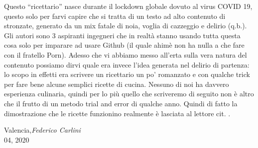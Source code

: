 %
%
%


\preface

Questo ``ricettario'' nasce durante il lockdown globale dovuto al virus COVID 19, questo solo per farvi capire che si tratta di un testo ad alto contenuto di stronzate, generato da un mix fatale di noia, voglia di cazzeggio e delirio (q.b.). Gli autori sono 3 aspiranti ingegneri che in realtà stanno usando tutta questa cosa solo per imparare ad usare Github (il quale ahimè non ha nulla a che fare con il fratello Porn).
Adesso che vi abbiamo messo all'erta sulla vera natura del contenuto possiamo dirvi quale era invece l'idea generata nel delirio di partenza: lo scopo in effetti era scrivere un ricettario un po' romanzato e con qualche trick per fare bene alcune semplici ricette di cucina. Nessuno di noi ha davvero esperienza culinaria, quindi per lo più quello che scriveremo di seguito non è altro che il frutto di un metodo trial and error di qualche anno. Quindi di fatto la dimostrazione che le ricette funzionino realmente è lasciata al lettore cit. . 


\vspace{1cm}
\begin{flushright}\noindent
Valencia,\hfill {\it Federico Carlini}\\
04, 2020\hfill\\
\end{flushright}


